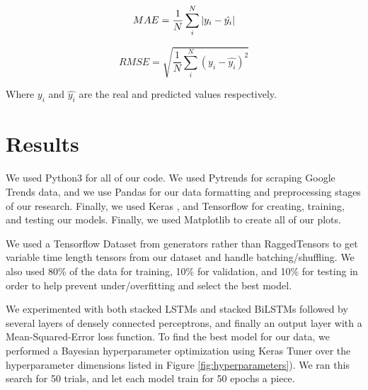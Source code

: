 \documentclass[final]{cvpr}
\begin{document}
    \begin{equation}
        MAE = \frac{1}{N}\sum_i^N|y_i - \hat{y_i}| \\
    \end{equation}

    \begin{equation}
        RMSE = \sqrt{\frac{1}{N}\sum_i^N(y_i - \hat{y_i})^2}
    \end{equation}

    Where $y_i$ and $\hat{y_i}$ are the real and predicted values respectively.

\section{Results}

    We used Python3 for all of our code. We used Pytrends for scraping Google
    Trends data, and we use Pandas \cite{pandas} for our data formatting and
    preprocessing stages of our research. Finally, we used Keras \cite{keras},
    and Tensorflow \cite{tensorflow} for creating, training, and testing our
    models. Finally, we used Matplotlib \cite{matplotlib} to create all of our
    plots.

    We used a Tensorflow Dataset from generators rather than RaggedTensors to
    get variable time length tensors from our dataset and handle
    batching/shuffling. We also used 80\% of the data for training, 10\% for
    validation, and 10\% for testing in order to help prevent under/overfitting
    and select the best model.
    
    We experimented with both stacked LSTMs and stacked BiLSTMs followed by 
    several layers of densely connected perceptrons, and finally an output layer
    with a Mean-Squared-Error loss function. To find the best model for our
    data, we performed a Bayesian hyperparameter optimization using Keras Tuner
    \cite{kerastuner} over the hyperparameter dimensions listed in Figure
    \ref{fig:hyperparameters}). We ran this search for 50 trials, and let each
    model train for 50 epochs a piece.
\end{document}
